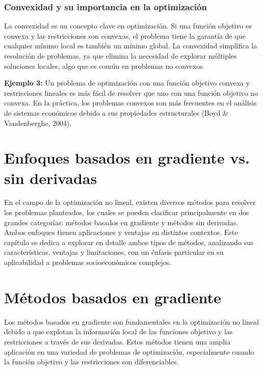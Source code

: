 \subsubsection{Convexidad y su importancia en la optimización}

\begin{flushleft}
	La convexidad es un concepto clave en optimización. Si una función objetivo es convexa y las restricciones son convexas, el problema tiene la garantía de que cualquier mínimo local es también un mínimo global. La convexidad simplifica la resolución de problemas, ya que elimina la necesidad de explorar múltiples soluciones locales, algo que es común en problemas no convexos.
\end{flushleft}

\begin{flushleft}
	\textbf{Ejemplo 3:} Un problema de optimización con una función objetivo convexa y restricciones lineales es más fácil de resolver que uno con una función objetivo no convexa. En la práctica, los problemas convexos son más frecuentes en el análisis de sistemas económicos debido a sus propiedades estructurales (Boyd \& Vandenberghe, 2004).
\end{flushleft}

\section{Enfoques basados en gradiente vs. sin derivadas}

\begin{flushleft}
	En el campo de la optimización no lineal, existen diversos métodos para resolver los problemas planteados, los cuales se pueden clasificar principalmente en dos grandes categorías: métodos basados en gradiente y métodos sin derivadas. Ambos enfoques tienen aplicaciones y ventajas en distintos contextos. Este capítulo se dedica a explorar en detalle ambos tipos de métodos, analizando sus características, ventajas y limitaciones, con un énfasis particular en su aplicabilidad a problemas socioeconómicos complejos.
\end{flushleft}

\section{Métodos basados en gradiente}

\begin{flushleft}
	Los métodos basados en gradiente son fundamentales en la optimización no lineal debido a que explotan la información local de las funciones objetivo y las restricciones a través de sus derivadas. Estos métodos tienen una amplia aplicación en una variedad de problemas de optimización, especialmente cuando la función objetivo y las restricciones son diferenciables.
\end{flushleft}

